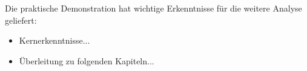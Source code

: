 Die praktische Demonstration hat wichtige Erkenntnisse für die weitere Analyse geliefert:
\begin{itemize}
    \item Kernerkenntnisse...
    \item Überleitung zu folgenden Kapiteln...
\end{itemize} 